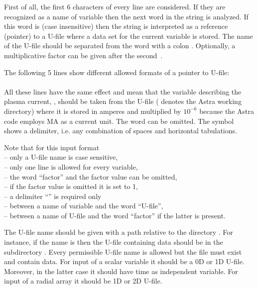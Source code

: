 First of all, the first 6 characters of every line are considered.
If they are recognized as a name of variable then the next word in the
string is analyzed. 
If this word is  (case insensitive) then the string is
interpreted as a reference (pointer) to a U-file where a data set for 
the current variable is stored. 
The name of the U-file should be separated from the word 
with a colon  .
Optionally, a multiplicative factor can be given after the 
second~. 

The following 5 lines show different allowed formats of a pointer to
U-file: 
\\
\\
All these lines have the same effect and mean that the variable
describing the plasma current, , should be taken from the
U-file  ( denotes the Astra working
directory) where it is stored in amperes and multiplied by 
$10^{-6}$ because the Astra code employs MA as a current unit. 
The word  can be omitted.
The symbol \tab~ shows a delimiter, i.e. any combination of 
spaces and horizontal tabulations.

Note that for this input format
\\ -- only a U-file name is case sensitive,
\\ -- only one line is allowed for every variable,
\\ -- the word ``factor'' and the factor value can be omitted,
\\ -- if the factor value is omitted it is set to 1,
\\ -- a delimiter ``\tab'' is required only
\\ \hspace*{5mm} -- between a name of variable and the word ``U-file'',
\\ \hspace*{5mm} -- between a name of U-file and the word ``factor'' 
if the latter is present. 

The U-file name should be given with a path relative to the directory
. 
For instance, if the name is  then the
U-file containing data should be in the subdirectory .
Every permissible U-file name is allowed but the file must exist and
contain data. 
For input of a scalar variable it should be a 0D or 1D U-file. 
Moreover, in the latter case it should have time as independent variable.
For input of a radial array it should be 1D or 2D U-file.

